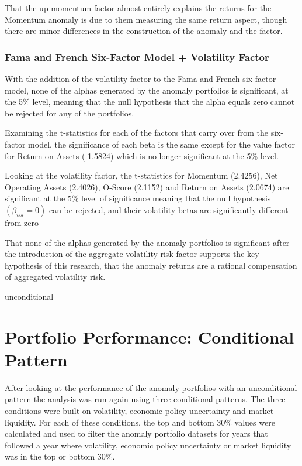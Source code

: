 \documentclass[12pt, a4paper, oneside]{article}
\begin{document}
That the up momentum factor almost entirely explains the returns for the Momentum anomaly is due to them measuring the same return aspect, though there are minor differences in the construction of the anomaly and the factor.

\subsubsection{Fama and French Six-Factor Model + Volatility Factor}
With the addition of the volatility factor to the Fama and French six-factor model, none of the alphas generated by the anomaly portfolios is significant, at the 5\% level, meaning that the null hypothesis that the alpha equals zero cannot be rejected for any of the portfolios. 

Examining the t-statistics for each of the factors that carry over from the six-factor model, the significance of each beta is the same except for the value factor for Return on Assets (-1.5824) which is no longer significant at the 5\% level. 

Looking at the volatility factor, the t-statistics for Momentum (2.4256), Net Operating Assets (2.4026), O-Score (2.1152) and Return on Assets (2.0674) are significant at the 5\% level of significance meaning that the null hypothesis $(\beta_{vol}= 0)$ can be rejected, and their volatility betas are significantly different from zero

That none of the alphas generated by the anomaly portfolios is significant after the introduction of the aggregate volatility risk factor supports the key hypothesis of this research, that the anomaly returns are a rational compensation of aggregated volatility risk.

{unconditional}

\section{Portfolio Performance: Conditional Pattern}\label{sec:conditional}
After looking at the performance of the anomaly portfolios with an unconditional pattern the analysis was run again using three conditional patterns. The three conditions were built on volatility, economic policy uncertainty and market liquidity. For each of these conditions, the top and bottom 30\% values were calculated and used to filter the anomaly portfolio datasets for years that followed a year where volatility, economic policy uncertainty or market liquidity was in the top or bottom 30\%.
\end{document}
